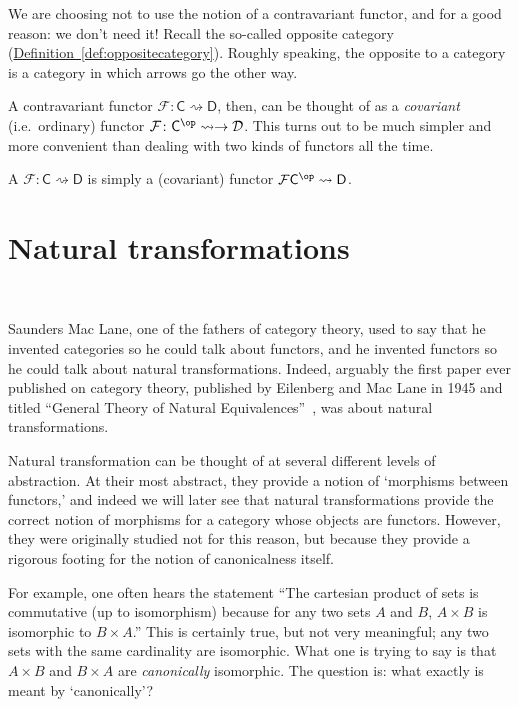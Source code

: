 \documentclass[main.tex]{subfiles}
\begin{document}
We are choosing not to use the notion of a contravariant functor, and for a good reason: we don't need it! Recall the so-called opposite category (\hyperref[def:oppositecategory]{Definition~\ref*{def:oppositecategory}}). Roughly speaking, the opposite to a category is a category in which arrows go the other way.

A contravariant functor $\mathcal{F}\colon \mathsf{C} \rightsquigarrow \mathsf{D}$, then, can be thought of as a \emph{covariant} (i.e.\ ordinary) functor $\mathcal{F}\colon \mathsf{C}^{\op} \rightsquigarrow \to \mathcal{D}$. This turns out to be much simpler and more convenient than dealing with two kinds of functors all the time.

\begin{definition}
  \label{def:contravariant_functor}
  A  $\mathcal{F}\colon \mathsf{C} \rightsquigarrow \mathsf{D}$ is simply a (covariant) functor $\mathcal{F}\mathsf{C}^{\op} \rightsquigarrow \mathsf{D}$.
\end{definition}


\section{Natural transformations}~\label{sec:naturaltransformations}

Saunders Mac Lane, one of the fathers of category theory, used to say that he invented categories so he could talk about functors, and he invented functors so he could talk about natural transformations. Indeed, arguably the first paper ever published on category theory, published by Eilenberg and Mac Lane in 1945 and titled ``General Theory of Natural Equivalences''~\cite{awodey-intro-to-categories}, was about natural transformations.

Natural transformation can be thought of at several different levels of abstraction. At their most abstract, they provide a notion of `morphisms between functors,' and indeed we will later see that natural transformations provide the correct notion of morphisms for a category whose objects are functors. However, they were originally studied not for this reason, but because they provide a rigorous footing for the notion of canonicalness itself.

For example, one often hears the statement ``The cartesian product of sets is commutative (up to isomorphism) because for any two sets $A$ and $B$, $A \times B$ is isomorphic to $B \times A$.'' This is certainly true, but not very meaningful; any two sets with the same cardinality are isomorphic. What one is trying to say is that $A \times B$ and $B \times A$ are \emph{canonically} isomorphic. The question is: what exactly is meant by `canonically'?
\end{document}
